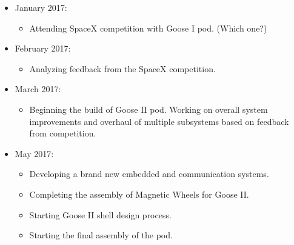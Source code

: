 \documentclass[11pt,a4paper,oldfontcommands]{memoir}
\begin{document}
\begin{itemize}
																																						           \item January 2017:
																																							       \begin{itemize}
																																							               \item Attending SpaceX competition with Goose I pod. (Which one?)
																																								           \end{itemize}

																																									           \item February 2017:
																																										       \begin{itemize}
																																										               \item Analyzing feedback from the SpaceX competition.
																																											           \end{itemize}

																																												           \item March 2017:
																																													       \begin{itemize}
																																													               \item Beginning the build of Goose II pod. Working on overall system improvements and overhaul of multiple subsystems based on feedback from competition.
																																														           \end{itemize}

																																															           \item May 2017:
																																																       \begin{itemize}
																																																               \item Developing a brand new embedded and communication systems.
																																																	               \item Completing the assembly of Magnetic Wheels for Goose II.
																																																		               \item Starting Goose II shell design process.
																																																			               \item Starting the final assembly of the pod.
																																																				           \end{itemize}


\end{itemize}
\end{document}
